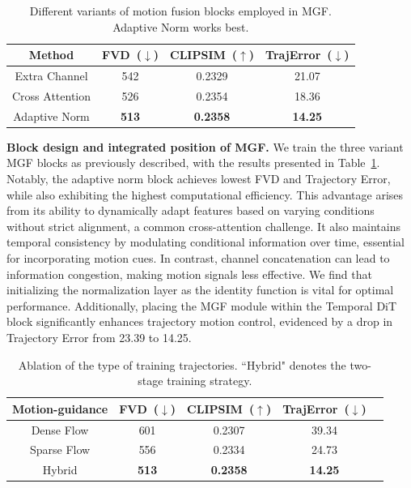 \begin{table}[!t]\footnotesize
\centering
\renewcommand{\arraystretch}{1.1}
\begin{tabular}{cccc}
\toprule
Method             & FVD~($\downarrow$) & CLIPSIM~($\uparrow$) & TrajError~($\downarrow$) \\ \midrule
Extra Channel &   542  &    0.2329     &   21.07               \\
Cross Attention    &   526  &    0.2354     &   18.36               \\
Adaptive Norm        & \textbf{513}    &   \textbf{0.2358}     & \textbf{14.25}                 \\ 
\bottomrule
\end{tabular}
\caption{Different variants of motion fusion blocks employed in MGF. Adaptive Norm works best.}
\label{tab3}
\vspace{-3mm}
\end{table}

\noindent \textbf{Block design and integrated position of MGF.} We train the three variant MGF blocks as previously described, with the results presented in Table~\ref{tab3}. Notably, the adaptive norm block achieves lowest FVD and Trajectory Error, while also exhibiting the highest computational efficiency. This advantage arises from its ability to dynamically adapt features based on varying conditions without strict alignment, a common cross-attention challenge. It also maintains temporal consistency by modulating conditional information over time, essential for incorporating motion cues. In contrast, channel concatenation can lead to information congestion, making motion signals less effective. We find that initializing the normalization layer as the identity function is vital for optimal performance. Additionally, placing the MGF module within the Temporal DiT block significantly enhances trajectory motion control, evidenced by a drop in Trajectory Error from 23.39 to 14.25. %

\begin{table}[!t]\footnotesize
\centering
\begin{tabular}{ccccc}
\toprule
Motion-guidance            & FVD~($\downarrow$) & CLIPSIM~($\uparrow$) & TrajError~($\downarrow$) \\ 
\midrule
Dense Flow &   601  &      0.2307   &               39.34   \\
Sparse Flow  &  556   &    0.2334    &        24.73          \\
Hybrid             &  \textbf{513}   &  \textbf{0.2358}       &   \textbf{14.25}               \\ 
\bottomrule
\end{tabular}
\caption{Ablation of the type of training trajectories. ``Hybrid" denotes the two-stage training strategy.}
\label{tab4}
\vspace{-3mm}
\end{table}


